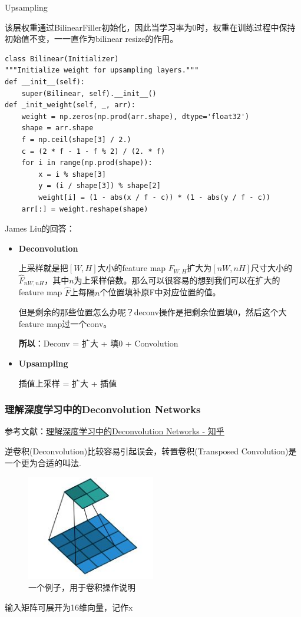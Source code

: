 Upsampling

该层权重通过BilinearFiller初始化，因此当学习率为0时，权重在训练过程中保持初始值不变，一一直作为bilinear resize的作用。

\begin{lstlisting}
class Bilinear(Initializer)
"""Initialize weight for upsampling layers."""
def __init__(self):
    super(Bilinear, self).__init__()
def _init_weight(self, _, arr):
    weight = np.zeros(np.prod(arr.shape), dtype='float32')
    shape = arr.shape
    f = np.ceil(shape[3] / 2.)
    c = (2 * f - 1 - f % 2) / (2. * f)
    for i in range(np.prod(shape)):
        x = i % shape[3]
        y = (i / shape[3]) % shape[2]
        weight[i] = (1 - abs(x / f - c)) * (1 - abs(y / f - c))
    arr[:] = weight.reshape(shape)
\end{lstlisting}

James Liu的回答：

\begin{itemize}
\item \textbf{Deconvolution}

上采样就是把$[W,H]$大小的feature map $F_{W,H}$扩大为$[nW,nH]$尺寸大小的$\hat{F}_{nW,nH}$，其中$n$为上采样倍数。那么可以很容易的想到我们可以在扩大的feature map $\hat{F}$上每隔$n$个位置填补原F中对应位置的值。

但是剩余的那些位置怎么办呢？deconv操作是把剩余位置填0，然后这个大feature map过一个conv。

\textbf{所以}：Deconv = 扩大 + 填0 + Convolution

\item \textbf{Upsampling}

插值上采样 = 扩大 + 插值

\end{itemize}

\subsubsection{理解深度学习中的Deconvolution Networks}

参考文献：\href{https://www.zhihu.com/question/43609045}{理解深度学习中的Deconvolution Networks - 知乎}


逆卷积(Deconvolution)比较容易引起误会，转置卷积(Transposed Convolution)是一个更为合适的叫法.

\begin{figure}[!hbtp]
\centering
\includegraphics[width=0.5\textwidth]{DLTips/Deconvolution1.png}
\caption{一个例子，用于卷积操作说明}
\label{Deconvolution1}
\end{figure}
输入矩阵可展开为16维向量，记作x

